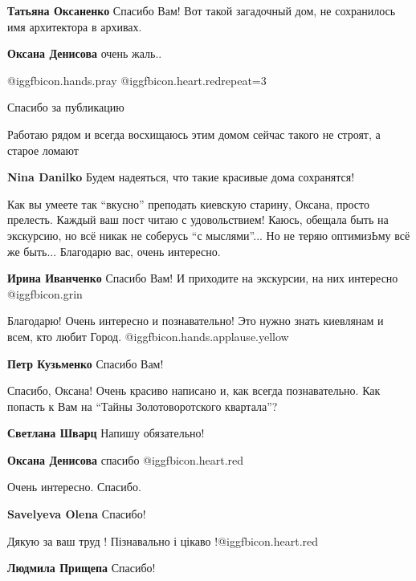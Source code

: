 \begin{itemize}
\begin{itemize} %
\textbf{Татьяна Оксаненко} Спасибо Вам! Вот такой загадочный дом, не сохранилось имя архитектора в архивах.

\textbf{Оксана Денисова} очень жаль..
\end{itemize} %

 @igg{fbicon.hands.pray} @igg{fbicon.heart.red}{repeat=3}

Спасибо за публикацию

Работаю рядом и всегда восхищаюсь этим домом сейчас такого не строят, а старое ломают

\textbf{Nina Danilko} Будем надеяться, что такие красивые дома сохранятся!


Как вы умеете так \enquote{вкусно} преподать киевскую старину, Оксана, просто
прелесть. Каждый ваш пост читаю с удовольствием! Каюсь, обещала быть на
экскурсию, но всё никак не соберусь \enquote{с мыслями}... Но не теряю оптимизЬму всё же
быть... Благодарю вас, очень интересно.

\textbf{Ирина Иванченко} Спасибо Вам! И приходите на экскурсии, на них интересно @igg{fbicon.grin} 


Благодарю! Очень интересно и познавательно! Это нужно знать киевлянам и всем, кто любит Город. @igg{fbicon.hands.applause.yellow} 

\textbf{Петр Кузьменко} Спасибо Вам!

Спасибо, Оксана! Очень красиво написано и, как всегда познавательно. Как попасть к Вам на \enquote{Тайны Золотоворотского квартала}?

\textbf{Светлана Шварц} Напишу обязательно!

\textbf{Оксана Денисова} спасибо @igg{fbicon.heart.red}

Очень интересно. Спасибо.

\textbf{Savelyeva Olena} Спасибо!

Дякую за ваш труд ! Пізнавально і цікаво !@igg{fbicon.heart.red}

\textbf{Людмила Прищепа} Спасибо!


\end{itemize}
